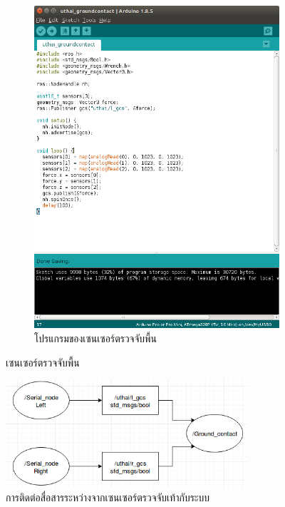 \begin{figure}[!ht]
\begin{subfigure}[b]{0.50\textwidth}
        \centering
        \includegraphics[width=\textwidth]{chapter3/images/code_arduino_uthai.png}
        \caption{โปรแกรมของเซนเซอร์ตรวจจับพื้น}
    \end{subfigure}
    \caption{เซนเซอร์ตรวจจับพื้น}
\end{figure}

\begin{figure}[!ht]
	\centering
	\includegraphics[width=0.8\textwidth]{chapter3/images/node_gcs.png}
	\caption{การติดต่อสื่อสารระหว่างจากเซนเซอร์ตรวจจับเท้ากับระบบ}
\end{figure}





